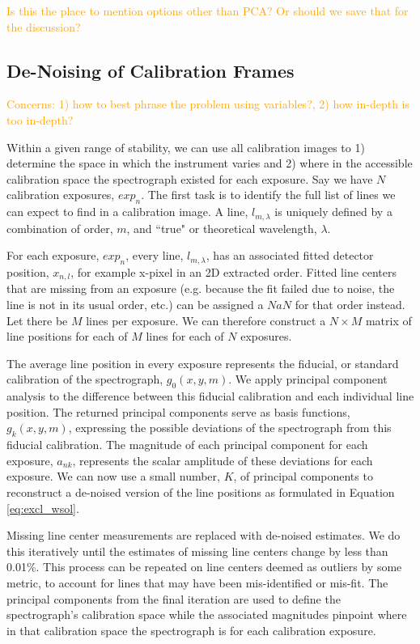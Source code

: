 \documentclass[twocolumn]{aastex63}
\newcommand{\lz}[1]{\textcolor{orange}{#1}}
\begin{document}
\lz{Is this the place to mention options other than PCA? Or should we save that for the discussion?}

\subsection{De-Noising of Calibration Frames} \label{sec:denoising}
\lz{Concerns: 1) how to best phrase the problem using variables?, 2) how in-depth is too in-depth?}

Within a given range of stability, we can use all calibration images to  1) determine the space in which the instrument varies and 2) where in the accessible calibration space the spectrograph existed for each exposure.  Say we have $N$ calibration exposures, $exp_n$.  The first task is to identify the full list of lines we can expect to find in a calibration image.  A line, $l_{m,\lambda}$ is uniquely defined by a combination of order, $m$, and ``true" or theoretical wavelength, $\lambda$. 

For each exposure, $exp_n$, every line, $l_{m,\lambda}$, has an associated fitted detector position, $x_{n,l}$, for example x-pixel in an 2D extracted order.  Fitted line centers that are missing from an exposure (e.g. because the fit failed due to noise, the line is not in its usual order, etc.) can be assigned a $NaN$ for that order instead.  Let there be $M$ lines per exposure.  We can therefore construct a $N \times M$ matrix of line positions for each of $M$ lines for each of $N$ exposures.

The average line position in every exposure represents the fiducial, or standard calibration of the spectrograph, $g_0(x,y,m)$.  We apply principal component analysis to the difference between this fiducial calibration and each individual line position.  The returned principal components serve as basis functions,  $g_k(x,y,m)$, expressing the possible deviations of the spectrograph from this fiducial calibration.  The magnitude of each principal component for each exposure, $a_{nk}$, represents the scalar amplitude of these deviations for each exposure.  We can now use a small number, $K$, of principal components to reconstruct a de-noised version of the line positions as formulated in Equation \ref{eq:excl_wsol}.

Missing line center measurements are replaced with de-noised estimates.  We do this iteratively until the estimates of missing line centers change by less than 0.01\%.  This process can be repeated on line centers deemed as outliers by some metric, to account for lines that may have been mis-identified or mis-fit.  The principal components from the final iteration are used to define the spectrograph's calibration space while the associated magnitudes pinpoint where in that calibration space the spectrograph is for each calibration exposure.
\end{document}
